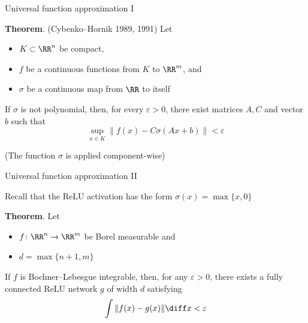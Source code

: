 \begin{frame}{Universal function approximation I}

    \textbf{Theorem}. (Cybenko--Hornik 1989, 1991) Let 
    \begin{itemize}
        \item $K \subset \RR^n$ be compact, 
        \item $f$ be a continuous functions from $K$ to $\RR^m$, and
        \item $\sigma$ be a continuous map from $\RR$ to itself
    \end{itemize}

    If $\sigma$ is not polynomial, then, for every $\varepsilon > 0$, 
    there exist matrices $A, C$ and vector $b$  such that
    \begin{equation*}
        \sup_{x \in K} \left\| f(x) - C \sigma(A x + b) \right\| 
        < \varepsilon
    \end{equation*}

    \medskip
    (The function $\sigma$ is applied component-wise) 

\end{frame}


\begin{frame}{Universal function approximation II}

    Recall that the ReLU activation has the form $\sigma(x) = \max\{x, 0 \}$

    \medskip
    \medskip

    \textbf{Theorem}. Let 
    \begin{itemize}
        \item $f \colon \RR^n \to \RR^m$ be Borel measurable and
        \item $d = \max\{n+1,m\}$
    \end{itemize}

    \medskip
    If $f$ is Bochner–Lebesgue integrable, then, for any $\varepsilon > 0$,
    there exists a fully connected ReLU network $g$ of width $d$ 
    satisfying 
    \begin{equation*}
        \int \|f(x) - g(x)\| \diff x < \varepsilon
    \end{equation*}

\end{frame}



